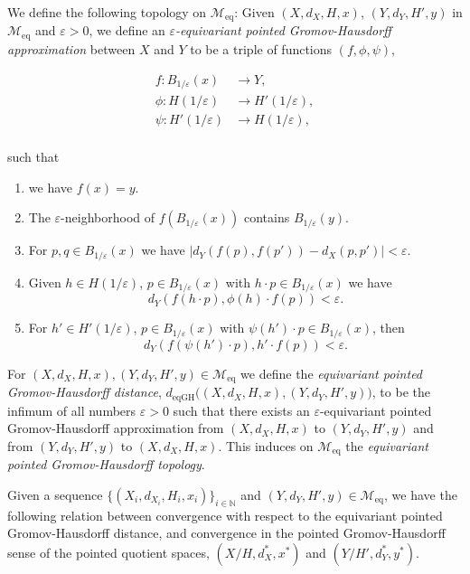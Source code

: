\documentclass[12pt,a4paper,reqno]{amsart}
\theoremstyle{definition}
\numberwithin{equation}{section}
\newcommand{\N}{\mathbb{N}} %
\begin{document}
We define the following topology on $\mathcal{M}_{\mathrm{eq}}$: Given $(X,d_X,H,x)$, $(Y,d_Y,H',y)$ in $\mathcal{M}_{\mathrm{eq}}$ and $\varepsilon>0$, we define an \emph{$\varepsilon$-equivariant pointed Gromov-Hausdorff approximation} between $X$ and $Y$ to be  a triple of functions $(f,\phi,\psi)$,
\begin{linenomath}
\begin{align*}
f\colon B_{1/\varepsilon}(x)&\to Y,\\
\phi\colon H(1/\varepsilon)&\to H'(1/\varepsilon),\\
\psi\colon H'(1/\varepsilon)&\to H(1/\varepsilon),\\
\end{align*}
\end{linenomath}
such that 
\begin{enumerate}[(1)]
\setlength\itemsep{0.2em}
\item we have $f(x) = y$.
\item The $\varepsilon$-neighborhood of $f(B_{1/\varepsilon}(x))$ contains $B_{1/\varepsilon}(y)$.
\item For $p,q\in B_{1/\varepsilon}(x)$ we have $|d_Y(f(p),f(p'))-d_X(p,p')|<\varepsilon$.
\item Given $h\in H(1/\varepsilon)$, $p\in B_{1/\varepsilon}(x)$ with $h\cdot p\in B_{1/\varepsilon}(x)$ we have
\[
d_Y(f(h\cdot p),\phi(h)\cdot f(p)) <\varepsilon.
\]
\item For $h'\in H'(1/\varepsilon)$, $p\in B_{1/\varepsilon}(x)$ with $\psi(h')\cdot p\in B_{1/\varepsilon}(x)$, then
\[
d_Y(f(\psi(h')\cdot p),h'\cdot f(p))<\varepsilon.
\]
\end{enumerate}
For $(X,d_X,H,x),(Y,d_Y,H',y)\in\mathcal{M}_{\mathrm{eq}}$ we define the \emph{equivariant pointed Gromov-Haus\-dorff distance}, $d_{\mathrm{eqGH}}\Big((X,d_X,H,x),(Y,d_Y,H',y)\Big)$, to be the infimum of all numbers $\varepsilon>0$ such that there exists an $\varepsilon$-equivariant pointed Gromov-Hausdorff approximation from $(X,d_X,H,x)$ to $(Y,d_Y,H',y)$ and from $(Y,d_Y,H',y)$ to $(X,d_X,H,x)$. This induces on $\mathcal{M}_{\mathrm{eq}}$ the \emph{equivariant pointed Gromov-Hausdorff topology}.

Given a sequence $\{(X_i,d_{X_i},H_i,x_i)\}_{i\in \N}$ and $(Y,d_Y,H',y)\in \mathcal{M}_{\mathrm{eq}}$, we have the following relation between convergence with respect to the equivariant pointed Gromov-Hausdorff distance, and convergence in the pointed Gromov-Hausdorff sense of the pointed quotient spaces, $(X/H,d_X^\ast,x^\ast)$ and $(Y/H',d_Y^\ast,y^\ast)$.
\end{document}
